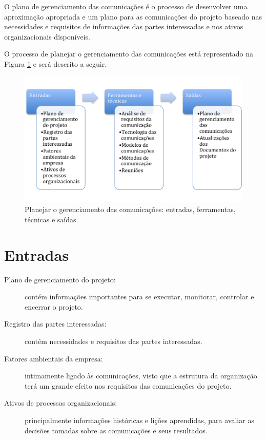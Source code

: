 O plano de gerenciamento das comunicações é o processo de desenvolver uma aproximação apropriada e um plano para as comunicações do projeto baseado nas necessidades e requisitos de informações das partes interessadas e nos ativos organizacionais disponíveis.

O processo de planejar o gerenciamento das comunicações está representado na Figura \ref{fig:comunic:plan:efts} e será descrito a seguir.

\begin{figure}[!h]
	\centering
	\includegraphics[scale=0.5]{Figuras/comunicacoes_efts_planejar.png}
	\caption{Planejar o gerenciamento das comunicações: entradas, ferramentas, técnicas e saídas}
	\label{fig:comunic:plan:efts}
\end{figure}

\section{Entradas}

\begin{description}
	
	\item[Plano de gerenciamento do projeto:] contém informações importantes para se executar, monitorar, controlar e encerrar o projeto.

	\item[Registro das partes interessadas:] contém necessidades e requisitos das partes interessadas.

	\item[Fatores ambientais da empresa:] intimamente ligado às comunicações, visto que a estrutura da organização terá um grande efeito nos requisitos das comunicações do projeto.

	\item[Ativos de processos organizacionais:] principalmente informações históricas e lições aprendidas, para avaliar as decisões tomadas sobre as comunicações e seus resultados.

\end{description}

